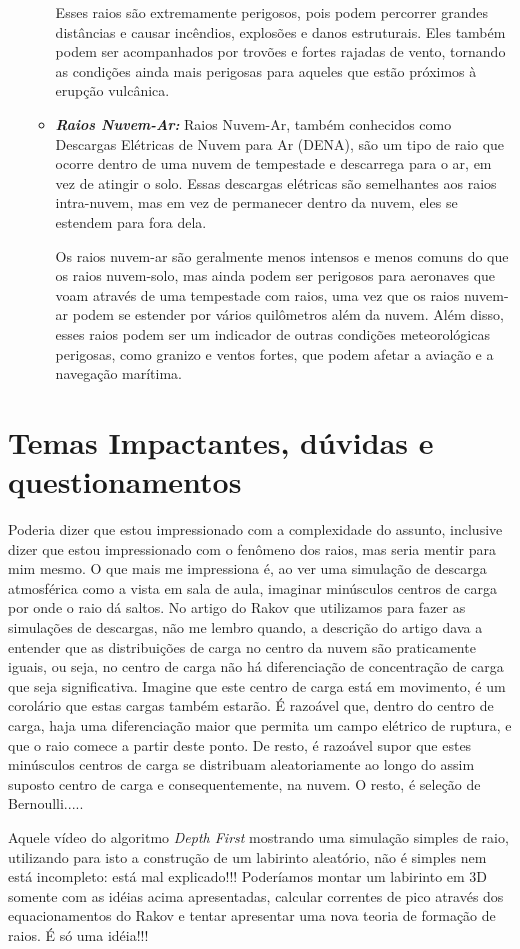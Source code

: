 \documentclass[a4paper, 12pt, onecolumn,singlespacing]{article}
\begin{document}
\begin{itemize}
\begin{itemize}
			Esses raios são extremamente perigosos, pois podem percorrer grandes distâncias e causar incêndios, explosões e danos estruturais. Eles também podem ser acompanhados por trovões e fortes rajadas de vento, tornando as condições ainda mais perigosas para aqueles que estão próximos à erupção vulcânica.
			
			\item \textbf{\textit{Raios Nuvem-Ar: }}Raios Nuvem-Ar, também conhecidos como Descargas Elétricas de Nuvem para Ar (DENA), são um tipo de raio que ocorre dentro de uma nuvem de tempestade e descarrega para o ar, em vez de atingir o solo. Essas descargas elétricas são semelhantes aos raios intra-nuvem, mas em vez de permanecer dentro da nuvem, eles se estendem para fora dela.
			
			Os raios nuvem-ar são geralmente menos intensos e menos comuns do que os raios nuvem-solo, mas ainda podem ser perigosos para aeronaves que voam através de uma tempestade com raios, uma vez que os raios nuvem-ar podem se estender por vários quilômetros além da nuvem. Além disso, esses raios podem ser um indicador de outras condições meteorológicas perigosas, como granizo e ventos fortes, que podem afetar a aviação e a navegação marítima.
			
		\end{itemize}
			
	\end{itemize}

	\section{Temas Impactantes, dúvidas e questionamentos}
	
	Poderia dizer que estou impressionado com a complexidade do assunto, inclusive dizer que estou impressionado com o fenômeno dos raios, mas seria mentir para mim mesmo. O que mais me impressiona é, ao ver uma simulação de descarga atmosférica como a vista em sala de aula, imaginar minúsculos centros de carga por onde o raio dá saltos. No artigo do Rakov que utilizamos para fazer as simulações de descargas, não me lembro quando, a descrição do artigo dava a entender que as distribuições de carga no centro da nuvem são praticamente iguais, ou seja, no centro de carga não há diferenciação de concentração de carga que seja significativa. Imagine que este centro de carga está em movimento, é um corolário que estas cargas também estarão. É razoável que, dentro do centro de carga, haja uma diferenciação maior que permita um campo elétrico de ruptura, e que o raio comece a partir deste ponto. De resto, é razoável supor que estes minúsculos centros de carga se distribuam aleatoriamente ao longo do assim suposto centro de carga e consequentemente, na nuvem. O resto, é seleção de Bernoulli.....
	
	Aquele vídeo do algoritmo \textit{Depth First} mostrando uma simulação simples de raio, utilizando para isto a construção de um labirinto aleatório, não é simples nem está incompleto: está mal explicado!!! Poderíamos montar um labirinto em 3D somente com as idéias acima apresentadas, calcular correntes de pico através dos equacionamentos do Rakov e tentar apresentar uma nova teoria de formação de raios. É só uma idéia!!!
\end{document}
